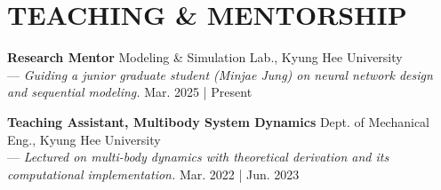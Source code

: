 \documentclass[a4paper,10pt]{extarticle}
\begin{document}
\section*{TEACHING \& MENTORSHIP}
\textbf{Research Mentor} \hfill Modeling \& Simulation Lab., Kyung Hee University\\
--- {\footnotesize\textsl{Guiding a junior graduate student (Minjae Jung) on neural network design and sequential modeling.}} \hfill Mar. 2025 | Present\\ %
\vspace*{-0.2cm}

\noindent
\textbf{Teaching Assistant, Multibody System Dynamics} \hfill Dept. of Mechanical Eng., Kyung Hee University\\
--- {\footnotesize\textsl{Lectured on multi-body dynamics with theoretical derivation and its computational implementation.}} \hfill Mar. 2022 | Jun. 2023 %


\end{document}
